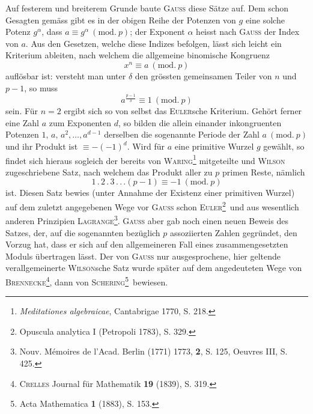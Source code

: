 Auf festerem und breiterem Grunde baute \textsc{Gauss} diese Sätze auf. Dem schon Gesagten gemäss gibt es in der obigen Reihe der Potenzen von \(g\) eine solche Potenz \(g^\alpha\), dass \(a\equiv g^\alpha\ (\mathrm{mod.}\ p)\); der Exponent \(\alpha\) heisst nach \textsc{Gauss} der Index von \(a\). Aus den Gesetzen, welche diese Indizes befolgen, lässt sich leicht ein Kriterium ableiten, nach welchem die allgemeine binomische Kongruenz
\[
x^n\equiv a\ (\mathrm{mod.}\ p)
\]
auflösbar ist: versteht man unter \(\delta\) den grössten gemeinsamen Teiler von \(n\) und \(p-1\), so muss
\[
a^{\frac{p-1}{\delta}}\equiv1\ (\mathrm{mod.}\ p)
\]
sein. Für \(n=2\) ergibt sich so von selbst das \textsc{Euler}sche Kriterium. Gehört ferner eine Zahl \(a\) zum Exponenten \(d\), so bilden die allein einander inkongruenten Potenzen \(1,\,a,\,a^2,\ldots,a^{d-1}\) derselben die sogenannte Periode der Zahl \(a\ (\mathrm{mod.}\ p)\) und ihr Produkt ist \(\equiv-(-1)^d\). Wird für \(a\) eine primitive
\clearpage{}
\noindent Wurzel \(g\) gewählt, so findet sich hieraus sogleich der bereits von \textsc{Waring}\footnote{\textit{Meditationes algebraicae}, Cantabrigae 1770, S. 218.} mitgeteilte und \textsc{Wilson} zugeschriebene Satz, nach welchem das Produkt aller zu \(p\) primen Reste, nämlich
\[
1\,.\,2\,.\,3\,.\,.\,.(p-1)\equiv-1\ (\mathrm{mod.}\ p)
\]
ist. Diesen Satz bewies (unter Annahme der Existenz einer primitiven Wurzel) auf dem zuletzt angegebenen Wege vor \textsc{Gauss} schon \textsc{Euler}\begingroup\renewcommand{\thefootnote}{**)}\footnote{Opuscula analytica I (Petropoli 1783), S. 329.}\endgroup\ und aus wesentlich anderen Prinzipien \textsc{Lagrange}\begingroup\renewcommand{\thefootnote}{***)}\footnote{Nouv. Mémoires de l’Acad. Berlin (1771) 1773, \textbf{2}, S. 125, Oeuvres III, S. 425.}\endgroup. \textsc{Gauss} aber gab noch einen neuen Beweis des Satzes, der, auf die sogenannten bezüglich \(p\) assoziierten Zahlen gegründet, den Vorzug hat, dass er sich auf den allgemeineren Fall eines zusammengesetzten Moduls übertragen lässt. Der von \textsc{Gauss} nur ausgesprochene, hier geltende verallgemeinerte \textsc{Wilson}sche Satz wurde später auf dem angedeuteten Wege von \textsc{Brennecke}\begingroup\renewcommand{\thefootnote}{†)}\footnote{\textsc{Crelles} Journal für Mathematik \textbf{19} (1839), S. 319.}\endgroup, dann von \textsc{Schering}\begingroup\renewcommand{\thefootnote}{††)}\footnote{Acta Mathematica \textbf{1} (1883), S. 153.}\endgroup\ bewiesen.
